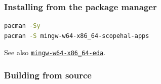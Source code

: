 \subsubsection{Installing from the package manager}

\begin{lstlisting}[language=sh, numbers=none]
pacman -Sy
pacman -S mingw-w64-x86_64-scopehal-apps
\end{lstlisting}

See also \href{https://packages.msys2.org/group/mingw-w64-x86_64-eda}{\lstinline{mingw-w64-x86_64-eda}}.

\subsubsection{Building from source}


